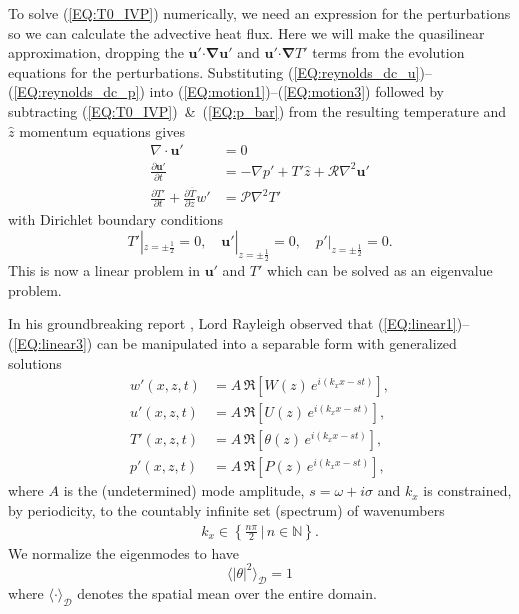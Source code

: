 \documentclass[reprint,amsmath,amssymb,aps,nofootinbib]{revtex4-1}
\renewcommand{\vec}[1]{\boldsymbol{#1}}
\newcommand{\eq}[1]{(\ref{#1})}
\newcommand{\eqs}[2]{(\ref{#1})~\&~(\ref{#2})}
\newcommand{\eqss}[2]{(\ref{#1})--(\ref{#2})}
\begin{document}
To solve \eq{EQ:T0_IVP} numerically, we need an expression for the perturbations so we can calculate the advective heat flux.
Here we will make the quasilinear approximation, dropping the $\vec{u}'\vec{\cdot}\vec{\nabla}\vec{u}'$ and $\vec{u}'\vec{\cdot}\vec{\nabla}T'$ terms from the evolution equations for the perturbations.
Substituting \eqss{EQ:reynolds_dc_u}{EQ:reynolds_dc_p} into \eqss{EQ:motion1}{EQ:motion3} followed by subtracting \eqs{EQ:T0_IVP}{EQ:p_bar} from the resulting temperature and $\hat{z}$ momentum equations gives
\begin{align}
    \nabla \cdot \vec{u'} &= 0 \label{EQ:linear1}\\
    \frac{\partial\vec{u'}}{\partial t} &= - \nabla p' + T'\hat{z} + \mathcal{R} \nabla^2 \vec{u'} \label{EQ:linear2}\\
    \frac{\partial T'}{\partial t} + \frac{\partial \overline{T}}{\partial z} w' &= \mathcal{P} \nabla^2 T' \label{EQ:linear3}
\end{align}
with Dirichlet boundary conditions 
\begin{equation}
    T'|_{z = \pm \frac{1}{2}} = 0, \quad \vec{u'}|_{z = \pm \frac{1}{2}} = 0, \quad p'|_{z = \pm \frac{1}{2}} = 0.
\end{equation}
This is now a linear problem in $\vec{u}'$ and $T'$ which can be solved as an eigenvalue problem.

In his groundbreaking report \cite{Rayleigh_1916}, Lord Rayleigh observed that \eqss{EQ:linear1}{EQ:linear3} can be manipulated into a separable form with generalized solutions
\begin{align}
    w'(x, z, t) &= A\, \Re\left[W(z) \, e^{i(k_xx-st)}\right], \label{EQ:normal_modes1}\\ 
    u'(x, z, t) &= A\, \Re\left[U(z) \, e^{i(k_xx-st)}\right], \label{EQ:normal_modes2}\\ 
    T'(x, z, t) &= A\, \Re\left[\theta(z) \, e^{i(k_xx-st)}\right], \label{EQ:normal_modes3}\\ 
    p'(x, z, t) &= A\, \Re\left[P(z) \, e^{i(k_xx-st)}\right], \label{EQ:normal_modes4}
\end{align}
where $A$ is the (undetermined) mode amplitude, $s = \omega + i\sigma$ and $k_x$ is constrained, by periodicity, to the countably infinite set (spectrum) of wavenumbers
\begin{align}
    k_x \in \left\{\frac{n\pi}{2} \, \big| \, n \in \mathbb{N}\right\}.
\end{align}
We normalize the eigenmodes to have
\begin{equation}
  \langle |\theta|^2 \rangle_{\mathcal{D}} = 1
\end{equation}
where $\langle \cdot \rangle_{\mathcal{D}}$ denotes the spatial mean over the entire domain.
\end{document}
